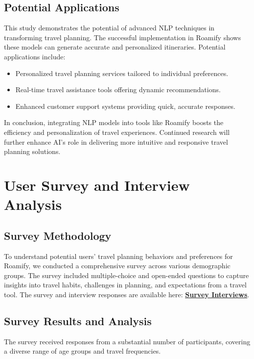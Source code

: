 \documentclass[conference]{IEEEtran}
\begin{document}
    \subsection{Potential Applications}

This study demonstrates the potential of advanced NLP techniques in transforming travel planning. The successful implementation in Roamify shows these models can generate accurate and personalized itineraries. Potential applications include:

\begin{itemize}
    \item Personalized travel planning services tailored to individual preferences.
    \item Real-time travel assistance tools offering dynamic recommendations.
    \item Enhanced customer support systems providing quick, accurate responses.
\end{itemize}

In conclusion, integrating NLP models into tools like Roamify boosts the efficiency and personalization of travel experiences. Continued research will further enhance AI's role in delivering more intuitive and responsive travel planning solutions.



\section{User Survey and Interview Analysis}

    \subsection{Survey Methodology}
        To understand potential users' travel planning behaviors and preferences for Roamify, we conducted a comprehensive survey across various demographic groups. The survey included multiple-choice and open-ended questions to capture insights into travel habits, challenges in planning, and expectations from a travel tool. The survey and interview responses are available here: \href{https://drive.google.com/drive/folders/1mKPTXZ7n7ZFmMEK6QBOKU0op3mf8hCta?usp=sharing}{\textbf{Survey Interviews}}.


    \subsection{Survey Results and Analysis}
        The survey received responses from a substantial number of participants, covering a diverse range of age groups and travel frequencies.
        \\
\end{document}
